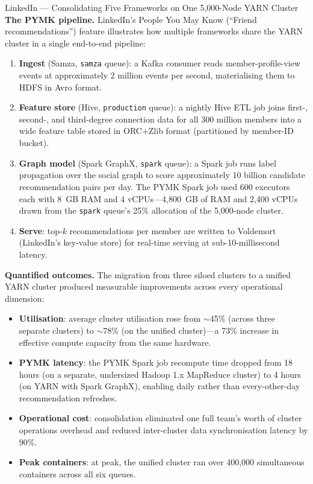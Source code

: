 \begin{casestudy}{LinkedIn --- Consolidating Five Frameworks on One 5{,}000-Node YARN Cluster}
\smallskip
\textbf{The PYMK pipeline.}
LinkedIn's People You May Know (``Friend recommendations'') feature
illustrates how multiple frameworks share the YARN cluster in a single
end-to-end pipeline:
\begin{enumerate}
  \item \textbf{Ingest} (Samza, \texttt{samza} queue): a Kafka consumer
        reads member-profile-view events at approximately 2 million
        events per second, materialising them to HDFS in Avro format.
  \item \textbf{Feature store} (Hive, \texttt{production} queue): a
        nightly Hive ETL job joins first-, second-, and third-degree
        connection data for all 300 million members into a wide feature
        table stored in ORC+Zlib format (partitioned by member-ID bucket).
  \item \textbf{Graph model} (Spark GraphX, \texttt{spark} queue): a
        Spark job runs label propagation over the social graph to score
        approximately 10 billion candidate recommendation pairs per day.
        The PYMK Spark job used 600 executors each with 8~GB RAM and
        4 vCPUs---4{,}800~GB of RAM and 2{,}400 vCPUs drawn from the
        \texttt{spark} queue's 25\% allocation of the 5{,}000-node cluster.
  \item \textbf{Serve}: top-$k$ recommendations per member are written
        to Voldemort (LinkedIn's key-value store) for real-time serving
        at sub-10-millisecond latency.
\end{enumerate}

\smallskip
\textbf{Quantified outcomes.}
The migration from three siloed clusters to a unified YARN cluster
produced measurable improvements across every operational dimension:
\begin{itemize}
  \item \textbf{Utilisation}: average cluster utilisation rose from
        $\sim$45\% (across three separate clusters) to $\sim$78\%
        (on the unified cluster)---a 73\% increase in effective
        compute capacity from the same hardware.
  \item \textbf{PYMK latency}: the PYMK Spark job recompute time
        dropped from 18 hours (on a separate, undersized Hadoop 1.x
        MapReduce cluster) to 4 hours (on YARN with Spark GraphX),
        enabling daily rather than every-other-day recommendation
        refreshes.
  \item \textbf{Operational cost}: consolidation eliminated one full
        team's worth of cluster operations overhead and reduced
        inter-cluster data synchronisation latency by 90\%.
  \item \textbf{Peak containers}: at peak, the unified cluster ran
        over 400{,}000 simultaneous containers across all six queues.
\end{itemize}


\end{casestudy}
